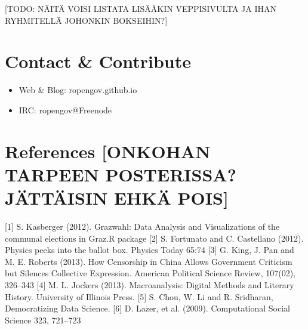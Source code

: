 \documentclass{article}\usepackage[]{graphicx}\usepackage[]{color}
\begin{document}
[TODO: NÄITÄ VOISI LISTATA LISÄÄKIN VEPPISIVULTA JA IHAN RYHMITELLÄ
JOHONKIN BOKSEIHIN?]


\section{Contact \& Contribute}

\begin{itemize}
 \item Web \& Blog: ropengov.github.io
 \item IRC: ropengov@Freenode
\end{itemize}

\section{References [ONKOHAN TARPEEN POSTERISSA? JÄTTÄISIN EHKÄ POIS]}

[1] S. Kasberger (2012). Grazwahl: Data Analysis and Visualizations of the communal elections in Graz.R package
[2] S. Fortunato and C. Castellano (2012). Physics peeks into the ballot box. Physics Today 65:74
[3] G. King, J. Pan and M. E. Roberts (2013). How Censorship in China Allows Government Criticism but Silences Collective Expression. American
Political Science Review, 107(02), 326–343
[4] M. L. Jockers (2013). Macroanalysis: Digital Methods and Literary History. University of Illinois Press.
[5] S. Chou, W. Li and R. Sridharan, Democratizing Data Science.
[6] D. Lazer, et al. (2009). Computational Social Science 323, 721–723
\end{document}
